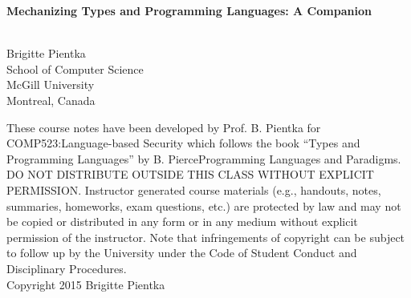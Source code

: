 \vspace{0.5cm}
\begin{center}
\begin{minipage}{15cm}
\begin{center}
\vspace{12mm}
\LARGE
{\bf Mechanizing Types and Programming Languages: A Companion}\\
\end{center}
\end{minipage}
\\
\vspace{2.5cm}
Brigitte Pientka\\
\vspace{1cm}
School of Computer Science\\
McGill University\\
Montreal, Canada
\\[12em]
$\;$
\\[3em]


\parbox{15cm}{\footnotesize{
These course notes have been developed by Prof. B. Pientka for
COMP523:Language-based Security which follows the book ``Types and
Programming Languages'' by B. PierceProgramming Languages and Paradigms. DO NOT DISTRIBUTE OUTSIDE THIS CLASS WITHOUT EXPLICIT PERMISSION. Instructor generated course materials (e.g., handouts, notes, summaries, homeworks, exam questions, etc.) are protected by law and may not be copied or distributed in any form or in any medium without explicit permission of the instructor. Note that infringements of copyright can be subject to follow up by the University under the Code of Student Conduct and Disciplinary Procedures.
\\[2em]
Copyright 2015 Brigitte Pientka}}
\end{center}

